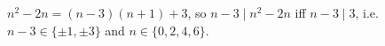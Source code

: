 $n^2-2n=(n-3)(n+1)+3$, so $n-3\mid n^2-2n$ iff $n-3\mid3$, i.e. $n-3\in\{\pm1,\pm3\}$ and $n\in\boxed{\{0,2,4,6\}}$.
